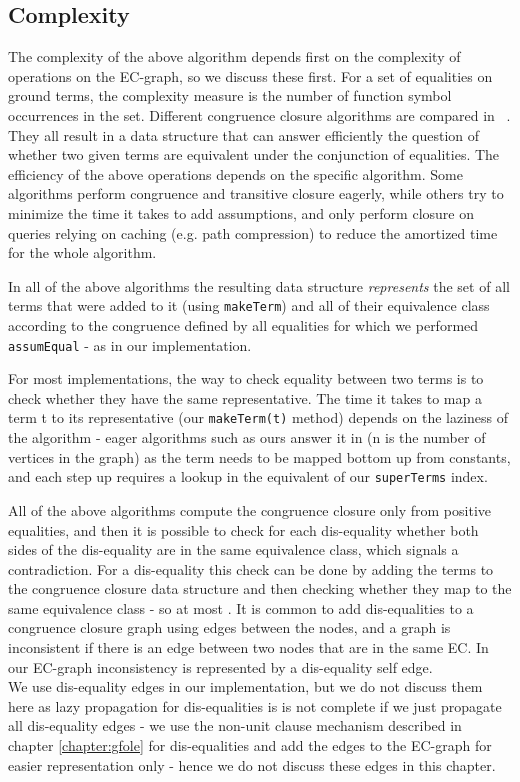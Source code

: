 \subsection{Complexity}
The complexity of the above algorithm depends first on the complexity of operations on the EC-graph, so we discuss these first.
For a set of equalities on ground terms, the complexity measure is the number of function symbol occurrences in the set.
Different congruence closure algorithms are compared in ~\cite{BachmairTiwari00}. They all result in a data structure that can answer efficiently the question of whether two given terms are equivalent under the conjunction of equalities.
The efficiency of the above operations depends on the specific algorithm. Some algorithms perform congruence and transitive closure eagerly, while others try to minimize the time it takes to add assumptions, and only perform closure on queries relying on caching (e.g. path compression) to reduce the amortized time for the whole algorithm.

In all of the above algorithms the resulting data structure \emph{represents} the set of all terms that were added to it (using \lstinline|makeTerm|) and all of their equivalence class according to the congruence defined by all equalities for which we performed \lstinline|assumEqual| - as in our implementation.

For most implementations, the way to check equality between two terms is to check whether they have the same representative.
The time it takes to map a term t to its representative (our \lstinline|makeTerm(t)| method) depends on the laziness of the algorithm - eager algorithms such as ours answer it in  (n is the number of vertices in the graph) as the term needs to be mapped bottom up from constants, and each step up requires a lookup in the equivalent of our \lstinline|superTerms| index.

All of the above algorithms compute the congruence closure only from positive equalities, and then it is possible to check for each dis-equality whether both sides of the dis-equality are in the same equivalence class, which signals a contradiction. 
For a dis-equality  this check can be done by adding the terms  to the congruence closure data structure and then checking whether they map to the same equivalence class - so at most .
It is common to add dis-equalities to a congruence closure graph using edges between the nodes, and a graph is inconsistent if there is an edge between two nodes that are in the same EC. In our EC-graph inconsistency is represented by a dis-equality self edge.\\
We use dis-equality edges in our implementation, but we do not discuss them here as lazy propagation for dis-equalities is is not complete if we just propagate all dis-equality edges - we use the non-unit clause mechanism described in chapter \ref{chapter:gfole} for dis-equalities and add the edges to the EC-graph for easier representation only - hence we do not discuss these edges in this chapter.

